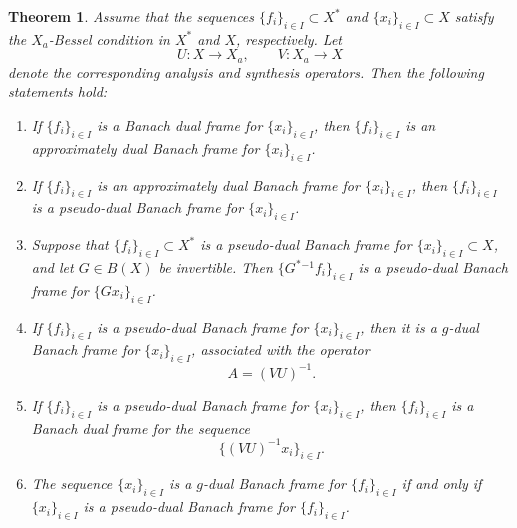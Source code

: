 \documentclass[10pt,a4paper]{amsart}
\newtheorem{theorem}{Theorem}
\begin{document}
\begin{theorem}
	Assume that the sequences \(\{f_i\}_{i\in I}\subset X^*\) and
	\(\{x_i\}_{i\in I}\subset X\) satisfy the \(X_a\)-Bessel condition in
	\(X^*\) and \(X\), respectively. Let
	\[
	U:X\to X_a,\qquad V:X_a\to X
	\]
	denote the corresponding analysis and synthesis operators. Then the
	following statements hold:
	
	\begin{enumerate}
		\item If \(\{f_i\}_{i\in I}\) is a Banach dual frame for
		\(\{x_i\}_{i\in I}\), then \(\{f_i\}_{i\in I}\) is an approximately
		dual Banach frame for \(\{x_i\}_{i\in I}\).
		
		\item If \(\{f_i\}_{i\in I}\) is an approximately dual Banach frame
		for \(\{x_i\}_{i\in I}\), then \(\{f_i\}_{i\in I}\) is a pseudo-dual
		Banach frame for \(\{x_i\}_{i\in I}\).
		
		\item Suppose that \(\{f_i\}_{i\in I}\subset X^*\) is a
		pseudo-dual Banach frame for \(\{x_i\}_{i\in I}\subset X\), and let
		\(G\in B(X)\) be invertible. Then \(\{G^*{}^{-1}f_i\}_{i\in I}\)
		is a pseudo-dual Banach frame for \(\{Gx_i\}_{i\in I}\).
		
		\item If \(\{f_i\}_{i\in I}\) is a pseudo-dual Banach frame for
		\(\{x_i\}_{i\in I}\), then it is a \(g\)-dual Banach frame for
		\(\{x_i\}_{i\in I}\), associated with the operator
		\[
		A=(VU)^{-1}.
		\]
		
		\item If \(\{f_i\}_{i\in I}\) is a pseudo-dual Banach frame for
		\(\{x_i\}_{i\in I}\), then \(\{f_i\}_{i\in I}\) is a Banach dual
		frame for the sequence
		\[
		\{(VU)^{-1}x_i\}_{i\in I}.
		\]
		
		\item The sequence \(\{x_i\}_{i\in I}\) is a \(g\)-dual Banach frame
		for \(\{f_i\}_{i\in I}\) if and only if
		\(\{x_i\}_{i\in I}\) is a pseudo-dual Banach frame for
		\(\{f_i\}_{i\in I}\).
	\end{enumerate}
\end{theorem}
\end{document}
